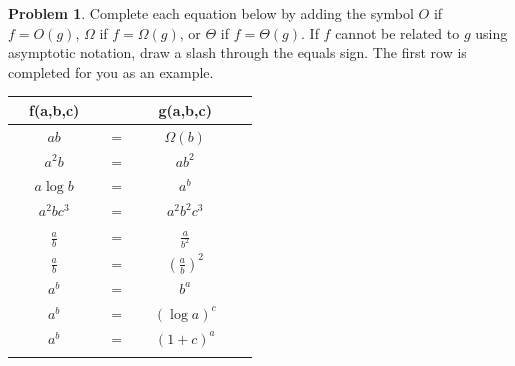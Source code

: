 \documentclass[10pt]{article}
\theoremstyle{definition}
\newtheorem{problem}{Problem}
\begin{document}
\newpage
\begin{problem}
    Complete each equation below by adding the symbol $O$ if $f=O(g)$, $\Omega$ if $f=\Omega(g)$, or $\Theta$ if $f=\Theta(g)$.  
    If $f$ cannot be related to $g$ using asymptotic notation, draw a slash through the equals sign.
    The first row is completed for you as an example.

{\renewcommand{\arraystretch}{4.4}
\begin{tabular}{c c c c c c}
    & f(a,b,c) &~\hspace{0.5in}~$ $~\hspace{0.5in}~& g(a,b,c) &\\
    \hline
    & $ab$ & ~\hspace{0.5in}~$=$~\hspace{0.5in}~  & $\Omega(b)$ &  &\\
    \arrayrulecolor{gray}\hline
    & $a^2b$ & ~\hspace{0.5in}~$=$~\hspace{0.5in}~  & $ab^2$ &  &\\
    \arrayrulecolor{gray}\hline
    & $a\log b$ & ~\hspace{0.5in}~$=$~\hspace{0.5in}~  & $a^b$ &  &\\
    \arrayrulecolor{gray}\hline
    & $a^2bc^3$ & ~\hspace{0.5in}~$=$~\hspace{0.5in}~  & $a^2b^2c^3$ &  &\\
    \arrayrulecolor{gray}\hline
    & $\frac ab$ & ~\hspace{0.5in}~$=$~\hspace{0.5in}~  & $\frac a {b^2}$ &  &\\
    \arrayrulecolor{gray}\hline
    & $\frac ab$ & ~\hspace{0.5in}~$=$~\hspace{0.5in}~  & $(\frac a b)^2$ &  &\\
    \arrayrulecolor{gray}\hline
    & $a^b$ & ~\hspace{0.5in}~$=$~\hspace{0.5in}~  & $b^a$ &  &\\
    \arrayrulecolor{gray}\hline
    & $a^b$ & ~\hspace{0.5in}~$=$~\hspace{0.5in}~  & $(\log a)^c$ &  &\\
    \arrayrulecolor{gray}\hline
    & $a^b$ & ~\hspace{0.5in}~$=$~\hspace{0.5in}~  & $(1+c)^a$ &  &\\
    \arrayrulecolor{gray}\hline


\end{tabular}}
\end{problem}
\end{document}
